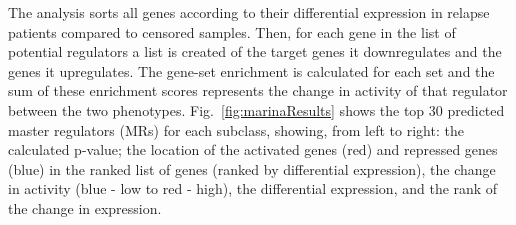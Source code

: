 \documentclass[10pt, letterpaper, twoside, english]{article}
\begin{document}



The analysis sorts all genes according to their differential expression in relapse patients
compared to censored samples.
Then, for each gene in the list of potential regulators a list is created of 
the target genes it downregulates and the genes it upregulates.
The gene-set enrichment is calculated for each set and the sum of these enrichment scores
represents the change in activity of that regulator between the two phenotypes.
Fig.~\ref{fig:marinaResults} shows the top 30 predicted master regulators (MRs) for each subclass,
showing, from left to right: the calculated p-value; the location of the activated genes (red)
and repressed genes (blue) in the ranked list of genes (ranked by differential expression), 
the change in activity (blue - low to red - high), the differential expression, 
and the rank of the change in expression.


\end{document}

